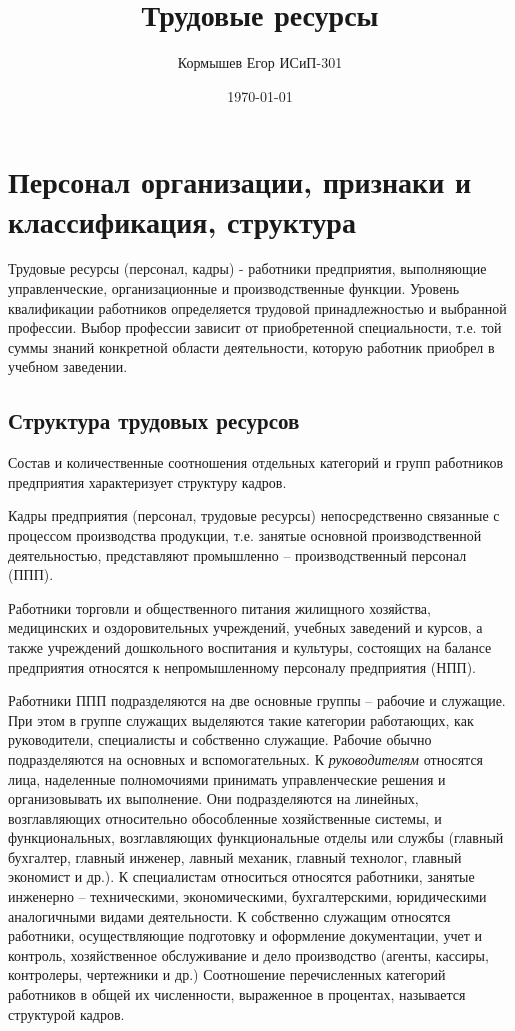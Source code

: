 \documentclass[11pt]{article}
\author{Кормышев Егор ИСиП-301}
\date{\today}
\title{Трудовые ресурсы}
\begin{document}
\maketitle
\tableofcontents



\section{Персонал организации, признаки и классификация, структура}
\label{sec:orgf2675e3}

Трудовые ресурсы (персонал, кадры) -  работники предприятия, выполняющие
управленческие, организационные и производственные функции. Уровень квалификации
работников определяется трудовой принадлежностью и выбранной профессии. Выбор
профессии зависит от приобретенной специальности, т.е. той суммы знаний конкретной
области деятельности, которую работник приобрел в учебном заведении.

\subsection{Структура трудовых ресурсов}
\label{sec:org55ae71e}

Состав и количественные соотношения отдельных категорий и групп работников
предприятия характеризует структуру кадров.

Кадры предприятия (персонал, трудовые ресурсы) непосредственно связанные с
процессом производства продукции, т.е. занятые основной производственной
деятельностью, представляют промышленно – производственный персонал (ППП).

Работники торговли и общественного питания жилищного хозяйства, медицинских и
оздоровительных учреждений, учебных заведений и курсов, а также учреждений
дошкольного воспитания и культуры, состоящих на балансе предприятия относятся к
непромышленному персоналу предприятия (НПП).

Работники ППП подразделяются на две основные группы – рабочие и служащие. При
этом в группе служащих выделяются такие категории работающих, как руководители,
специалисты и собственно служащие. Рабочие обычно подразделяются на основных и
вспомогательных.
К
\emph{руководителям}
относятся лица, наделенные полномочиями принимать
управленческие решения и организовывать их выполнение. Они подразделяются на
линейных, возглавляющих относительно обособленные хозяйственные системы, и
функциональных, возглавляющих функциональные отделы или службы (главный
бухгалтер, главный инженер, лавный механик, главный технолог, главный экономист и
др.).
К
специалистам
относиться относятся работники, занятые инженерно –
техническими,
экономическими,
бухгалтерскими,
юридическими
аналогичными видами деятельности.
К собственно служащим относятся работники, осуществляющие подготовку и
оформление документации, учет и контроль, хозяйственное обслуживание и дело
производство (агенты, кассиры, контролеры, чертежники и др.)
Соотношение перечисленных категорий работников в общей их численности,
выраженное в процентах, называется структурой кадров.
\end{document}
